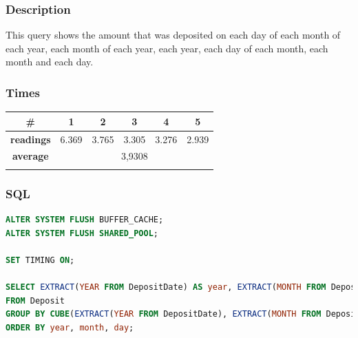 \documentclass[a4paper, 10pt]{article}
\begin{document}
\subsubsection{Description}
This query shows the amount that was deposited on each day of each month of each year, each month of each year, each year, each day of each month, each month and each day.
\subsubsection{Times}
\begin{table}[H]
\centering
\begin{tabular}{cccccc}
\hline
\multicolumn{1}{|c|}{\textbf{\#}}       & \multicolumn{1}{c|}{\textbf{1}} & \multicolumn{1}{c|}{\textbf{2}} & \multicolumn{1}{c|}{\textbf{3}} & \multicolumn{1}{c|}{\textbf{4}} & \multicolumn{1}{c|}{\textbf{5}} \\ \hline
\multicolumn{1}{|c|}{\textbf{readings}} & \multicolumn{1}{c|}{6.369}           & \multicolumn{1}{c|}{3.765}           & \multicolumn{1}{c|}{3.305}           & \multicolumn{1}{c|}{3.276}           & \multicolumn{1}{c|}{2.939}           \\ \hline
\multicolumn{1}{|c|}{\textbf{average}}      & \multicolumn{5}{c|}{3,9308}                                                                                                                                                   \\ \hline
\textbf{}                               & \textbf{}                       & \textbf{}                       & \textbf{}                       & \textbf{}                       & \textbf{}                      
\end{tabular}
\end{table}
\subsubsection{SQL}
\begin{lstlisting}[language=SQL]
ALTER SYSTEM FLUSH BUFFER_CACHE;
ALTER SYSTEM FLUSH SHARED_POOL;

SET TIMING ON;

SELECT EXTRACT(YEAR FROM DepositDate) AS year, EXTRACT(MONTH FROM DepositDate) AS month, EXTRACT(DAY FROM DepositDate) AS day, SUM(amount)
FROM Deposit
GROUP BY CUBE(EXTRACT(YEAR FROM DepositDate), EXTRACT(MONTH FROM DepositDate), EXTRACT(DAY FROM DepositDate))
ORDER BY year, month, day;
\end{lstlisting}
\end{document}
